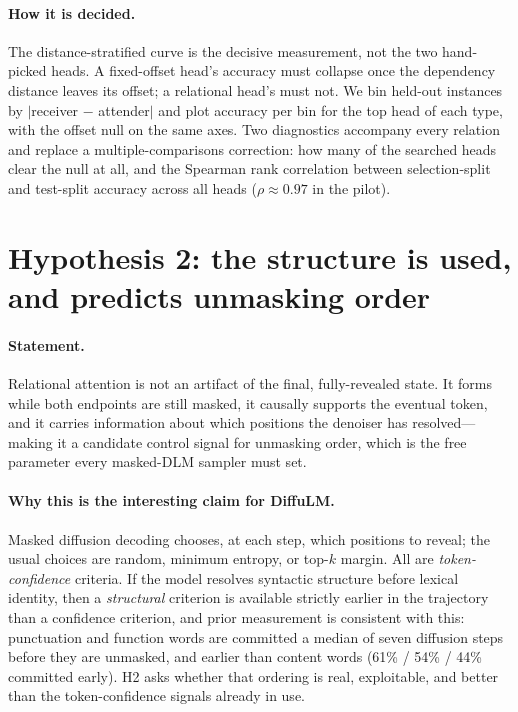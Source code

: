\documentclass{article}
\begin{document}
\paragraph{How it is decided.} The distance-stratified curve is the decisive
measurement, not the two hand-picked heads. A fixed-offset head's accuracy must
collapse once the dependency distance leaves its offset; a relational head's
must not. We bin held-out instances by $|$receiver $-$ attender$|$ and plot
accuracy per bin for the top head of each type, with the offset null on the same
axes. Two diagnostics accompany every relation and replace a multiple-comparisons
correction: how many of the searched heads clear the null at all, and the
Spearman rank correlation between selection-split and test-split accuracy across
all heads ($\rho \approx 0.97$ in the pilot).

\section{Hypothesis 2: the structure is used, and predicts unmasking order}

\paragraph{Statement.} Relational attention is not an artifact of the final,
fully-revealed state. It forms while both endpoints are still masked, it
causally supports the eventual token, and it carries information about which
positions the denoiser has resolved---making it a candidate control signal for
unmasking order, which is the free parameter every masked-DLM sampler must set.

\paragraph{Why this is the interesting claim for DiffuLM.} Masked diffusion
decoding chooses, at each step, which positions to reveal; the usual choices are
random, minimum entropy, or top-$k$ margin. All are \emph{token-confidence}
criteria. If the model resolves syntactic structure before lexical identity,
then a \emph{structural} criterion is available strictly earlier in the
trajectory than a confidence criterion, and prior measurement is consistent with
this: punctuation and function words are committed a median of seven diffusion
steps before they are unmasked, and earlier than content words (61\% / 54\% /
44\% committed early). H2 asks whether that ordering is real, exploitable, and
better than the token-confidence signals already in use.
\end{document}
